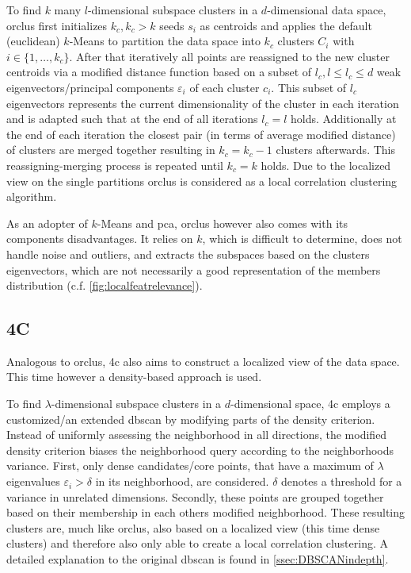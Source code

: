 To find $k$ many $l$-dimensional subspace clusters in a $d$-dimensional data space, \gls{orclus} first initializes $k_c, k_c > k$ seeds $s_i$ as centroids and applies the default (euclidean) $k$-Means to partition the data space into $k_c$ clusters $C_i$ with $i \in \{1,\dotsc,k_c\}$. After that iteratively all points are reassigned to the new cluster centroids via a modified distance function based on a subset of $l_c, l\leq l_c \leq d$ weak eigenvectors/principal components $\varepsilon_i$ of each cluster $c_i$. This subset of $l_c$ eigenvectors represents the current dimensionality of the cluster in each iteration and is adapted such that at the end of all iterations $l_c=l$ holds. Additionally at the end of each iteration the closest pair (in terms of average modified distance) of clusters are merged together resulting in $k_c = k_c-1$ clusters afterwards. This reassigning-merging process is repeated until $k_c = k$ holds. Due to the localized view on the single partitions \gls{orclus} is considered as a local correlation clustering algorithm\cite{orclusaggarwal2000finding}.

As an adopter of $k$-Means and \gls{pca}, \gls{orclus} however also comes with its components disadvantages. It relies on $k$, which is difficult to determine, does not handle noise and outliers, and extracts the subspaces based on the clusters eigenvectors, which are not necessarily a good representation of the members distribution (c.f. \autoref{fig:localfeatrelevance}).


\subsection{4C}\label{ssec:4c}
Analogous to \gls{orclus}, \gls{4c} also aims to construct a localized view of the data space. This time however a density-based approach is used. 

To find $\lambda$-dimensional subspace clusters in a $d$-dimensional space, \gls{4c} employs a customized/an extended \acrshort{dbscan} by modifying parts of the density criterion. 
Instead of uniformly assessing the neighborhood in all directions, the modified density criterion biases the neighborhood query according to the neighborhoods variance. First, only dense candidates/core points, that have a maximum of $\lambda$ eigenvalues $\varepsilon_i > \delta$ in its neighborhood, are considered. $\delta$ denotes a threshold for a variance in unrelated dimensions. Secondly, these points are grouped together based on their membership in each others modified neighborhood. These resulting clusters are, much like \gls{orclus}, also based on a localized view (this time dense clusters) and therefore also only able to create a local correlation clustering\cite{4cbohm2004computing}. A detailed explanation to the original \acrshort{dbscan} is found in \autoref{ssec:DBSCANindepth}.

